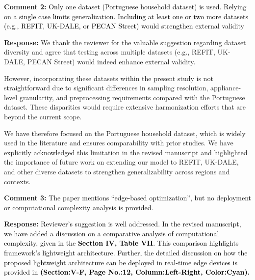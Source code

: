 \documentclass[12pt]{article}
\begin{document}
\noindent\textbf{Comment 2:} \textcolor{black}{Only one dataset (Portuguese household dataset) is used. Relying on a single case limits generalization. Including at least one or two more datasets (e.g., REFIT, UK-DALE, or PECAN Street) would strengthen external validity}
\vspace{0.15cm}

\hspace{-1.5em}\textbf{Response:}
We thank the reviewer for the valuable suggestion regarding dataset diversity and agree that testing across multiple datasets (e.g., REFIT, UK-DALE, PECAN Street) would indeed enhance external validity. 

However, incorporating these datasets within the present study is not straightforward due to significant differences in sampling resolution, appliance-level granularity, and preprocessing requirements compared with the Portuguese dataset. These disparities would require extensive harmonization efforts that are beyond the current scope.

We have therefore focused on the Portuguese household dataset, which is widely used in the literature and ensures comparability with prior studies. We have explicitly acknowledged this limitation in the revised manuscript and highlighted the importance of future work on extending our model to REFIT, UK-DALE, and other diverse datasets to strengthen generalizability across regions and contexts.\newline
\newline




\noindent\textbf{Comment 3:} \noindent\textcolor{black}{The paper mentions “edge-based optimization”, but no deployment or computational complexity analysis is provided.}
\vspace{0.15cm}

\hspace{-1.5em}\textbf{Response:}
\noindent\textcolor{black}{Reviewer's suggestion is well addressed. In the revised manuscript, we have added a discussion on a comparative analysis of computational complexity, given in the \textbf{Section IV, Table VII}. This comparison highlights framework's lightweight architecture. Further, the detailed discussion on how the proposed lightweight architecture can be deployed in real-time edge devices is provided in \textbf{(Section:V-F, Page No.:12, Column:Left-Right, Color:Cyan).}}\newline
\newline
\end{document}
